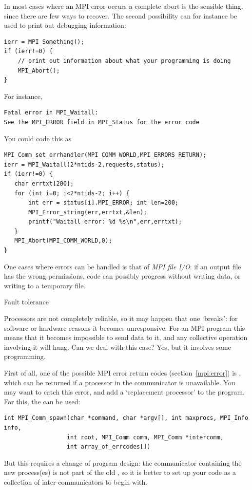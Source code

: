 In most cases where an MPI error occurs a complete abort is the
sensible thing, since there are few ways to recover. The second
possibility can for instance be used to print out debugging
information:
\begin{verbatim}
ierr = MPI_Something();
if (ierr!=0) {
    // print out information about what your programming is doing
    MPI_Abort();
}
\end{verbatim}
For instance,
\begin{verbatim}
Fatal error in MPI_Waitall: 
See the MPI_ERROR field in MPI_Status for the error code
\end{verbatim}
You could code this as
\begin{verbatim}
MPI_Comm_set_errhandler(MPI_COMM_WORLD,MPI_ERRORS_RETURN);
ierr = MPI_Waitall(2*ntids-2,requests,status);
if (ierr!=0) {
   char errtxt[200];
   for (int i=0; i<2*ntids-2; i++) {
       int err = status[i].MPI_ERROR; int len=200;
       MPI_Error_string(err,errtxt,&len);
       printf("Waitall error: %d %s\n",err,errtxt);
   }
   MPI_Abort(MPI_COMM_WORLD,0);
}
\end{verbatim}
One cases where errors can be handled is that of \emph{MPI file
  I/O}: if an output file has the wrong
permissions, code can possibly progress without writing data, or
writing to a temporary file.

 {Fault tolerance}
\label{mpi:tolerant}

Processors are not completely reliable, so it may happen that one
`breaks': for software or hardware reasons it becomes
unresponsive. For an MPI program this means that it becomes impossible
to send data to it, and any collective operation involving it will
hang. Can we deal with this case? Yes, but it involves some
programming.

First of all, one of the possible MPI error return codes
(section~\ref{mpi:error}) is , which can be returned
if a processor in the communicator is unavailable. You may want to
catch this error, and add a `replacement processor' to the
program. For this, the  can be used:
\begin{verbatim}
int MPI_Comm_spawn(char *command, char *argv[], int maxprocs, MPI_Info info, 
                  int root, MPI_Comm comm, MPI_Comm *intercomm,
                  int array_of_errcodes[])
\end{verbatim}
But this requires a change of program design: the communicator
containing the new process(es) is not part of the
old , so it is better to set up your code as a
collection of inter-communicators to begin with.

